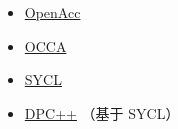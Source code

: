 

\begin{itemize}
\item \href{https://www.openacc.org/}{OpenAcc}
\item \href{https://libocca.org/}{OCCA}
\item \href{https://www.khronos.org/api/index_2017/sycl}{SYCL}
\item \href{https://www.intel.com/content/www/us/en/developer/tools/oneapi/dpc-compiler.html#gs.5ytas2}{DPC++} （基于 SYCL）
\end{itemize}

